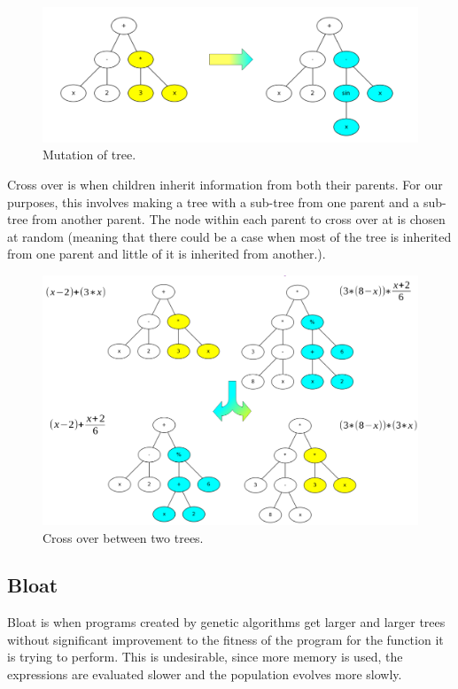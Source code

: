 \begin{figure}[H]
\centering
\includegraphics[width=\textwidth]{images/mutation}
\caption{Mutation of tree.}
\end{figure}


Cross over is when children inherit information from both their
parents. For our purposes, this involves making a tree with a sub-tree
from one parent and a sub-tree from another parent. The node within
each parent to cross over at is chosen at random (meaning that there
could be a case when most of the tree is inherited from one parent and
little of it is inherited from another.).

\begin{figure}[H]
\centering
\includegraphics[width=\textwidth]{images/cross-over}
\caption{Cross over between two trees.}
\end{figure}

\subsection{Bloat}

Bloat is when programs created by genetic algorithms get larger and
larger trees without significant improvement to the fitness of the
program for the function it is trying to perform. This is undesirable,
since more memory is used, the expressions are evaluated slower and
the population evolves more slowly.

